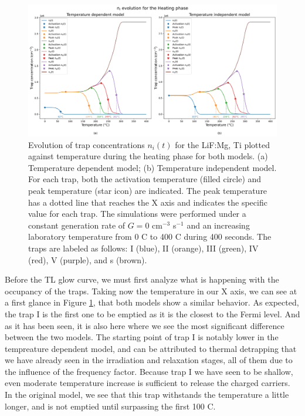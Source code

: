 \begin{figure}[ht]
    \centering
    \includegraphics[width=\textwidth]{Images/GC_ActivationAndPeakTemperatures.png}
    \caption{Evolution of trap concentrations $n_i(t)$ for the LiF:Mg, Ti plotted against temperature during the heating phase for both models. (a) Temperature dependent model; (b) Temperature independent model. For each trap, both the activation temperature (filled circle) and peak temperature (star icon) are indicated. The peak temperature has a dotted line that reaches the X axis and indicates the specific value for each trap. The simulations were performed under a constant generation rate of $G = 0$ cm$^{-3}$ s$^{-1}$ and an increasing laboratory temperature from 0 \textdegree C to 400 \textdegree C during 400 seconds. The traps are labeled as follows: I (blue), II (orange), III (green), IV (red), V (purple), and s (brown).}
    \label{fig:GC_ActivationAndPeakTemperatures}
\end{figure}

\vspace{10pt}
Before the TL glow curve, we must first analyze what is happening with the occupancy of the traps. Taking now the temperature in our X axis, we can see at a first glance in Figure \ref{fig:GC_ActivationAndPeakTemperatures}, that both models show a similar behavior. As expected, the trap I is the first one to be emptied as it is the closest to the Fermi level. And as it has been seen, it is also here where we see the most significant difference between the two models. The starting point of trap I is notably lower in the tempreature dependent model, and can be attributed to thermal detrapping that we have already seen in the irradiation and relaxation stages, all of them due to the influence of the frequency factor. Because trap I we have seen to be shallow, even moderate temperature increase is sufficient to release the charged carriers. In the original model, we see that this trap withstands the temperature a little longer, and is not emptied until surpassing the first 100 \textdegree C. 

